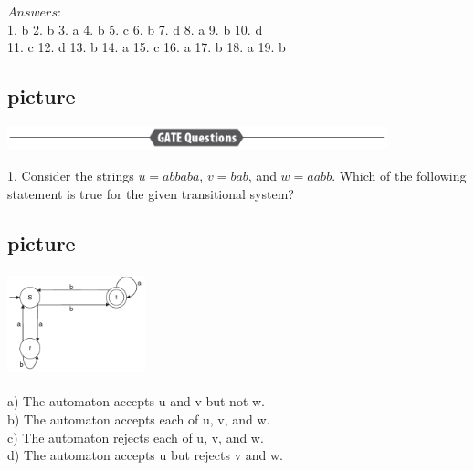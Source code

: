 $Answers:$ \\
1. b    \hspace*{0.3cm}    2. b    \hspace*{0.3cm}   3. a     \hspace*{0.3cm}    4. b     \hspace*{0.3cm}    5. c     \hspace*{0.3cm}     6. b     \hspace*{0.3cm}     7. d       \hspace*{0.3cm}       8. a      \hspace*{0.3cm}    9. b      \hspace*{0.3cm}     10. d \\
11. c    \hspace*{0.3cm}    12. d     \hspace*{0.3cm}    13. b      \hspace*{0.3cm}    14. a      \hspace*{0.3cm}    15. c    \hspace*{0.3cm}     16. a     \hspace*{0.3cm}    17. b      \hspace*{0.3cm}       18. a     \hspace*{0.3cm}    19. b \\ 

\begin{center}
	\section{picture}
	\includegraphics[width=11cm,height=0.7cm]{./content/chapter03/pictures/120.png}
\end{center}

1. Consider the strings $u = abbaba$, $v = bab$, and $w = aabb$. Which of the following statement is true
for the given transitional system?\\
\begin{center}
	\section{picture}
	\includegraphics[width=4cm,height=3cm]{./content/chapter03/pictures/120-1.png}
\end{center}

\vspace*{0.1cm}
a) The automaton accepts u and v but not w.\\
b) The automaton accepts each of u, v, and w.\\
c) The automaton rejects each of u, v, and w.\\
d) The automaton accepts u but rejects v and w.\\